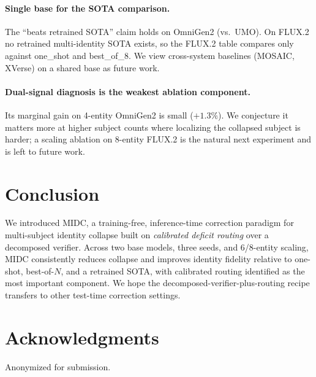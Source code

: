 \documentclass[letterpaper]{article}
\begin{document}
\paragraph{Single base for the SOTA comparison.} The ``beats retrained SOTA'' claim holds on OmniGen2 (vs.\ UMO). On FLUX.2 no retrained multi-identity SOTA exists, so the FLUX.2 table compares only against one\_shot and best\_of\_8. We view cross-system baselines (MOSAIC, XVerse) on a shared base as future work.

\paragraph{Dual-signal diagnosis is the weakest ablation component.} Its marginal gain on 4-entity OmniGen2 is small ($+1.3\%$). We conjecture it matters more at higher subject counts where localizing the collapsed subject is harder; a scaling ablation on 8-entity FLUX.2 is the natural next experiment and is left to future work.

\section{Conclusion}

We introduced MIDC, a training-free, inference-time correction paradigm for multi-subject identity collapse built on \emph{calibrated deficit routing} over a decomposed verifier. Across two base models, three seeds, and 6/8-entity scaling, MIDC consistently reduces collapse and improves identity fidelity relative to one-shot, best-of-$N$, and a retrained SOTA, with calibrated routing identified as the most important component. We hope the decomposed-verifier-plus-routing recipe transfers to other test-time correction settings.

\section*{Acknowledgments}
Anonymized for submission.


\end{document}
